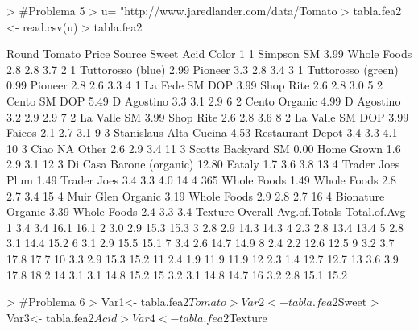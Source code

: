 \documentclass{article}
\begin{document}
\begin{Schunk}
\begin{Sinput}
> #Problema 5
> u= "http://www.jaredlander.com/data/Tomato%20First.csv"
> tabla.fea2 <- read.csv(u)
> tabla.fea2
\end{Sinput}
\begin{Soutput}
   Round                   Tomato Price           Source Sweet Acid Color
1      1               Simpson SM  3.99      Whole Foods   2.8  2.8   3.7
2      1        Tuttorosso (blue)  2.99          Pioneer   3.3  2.8   3.4
3      1       Tuttorosso (green)  0.99          Pioneer   2.8  2.6   3.3
4      1           La Fede SM DOP  3.99        Shop Rite   2.6  2.8   3.0
5      2             Cento SM DOP  5.49       D Agostino   3.3  3.1   2.9
6      2            Cento Organic  4.99       D Agostino   3.2  2.9   2.9
7      2              La Valle SM  3.99        Shop Rite   2.6  2.8   3.6
8      2          La Valle SM DOP  3.99           Faicos   2.1  2.7   3.1
9      3   Stanislaus Alta Cucina  4.53 Restaurant Depot   3.4  3.3   4.1
10     3                     Ciao    NA            Other   2.6  2.9   3.4
11     3       Scotts Backyard SM  0.00       Home Grown   1.6  2.9   3.1
12     3 Di Casa Barone (organic) 12.80           Eataly   1.7  3.6   3.8
13     4         Trader Joes Plum  1.49      Trader Joes   3.4  3.3   4.0
14     4          365 Whole Foods  1.49      Whole Foods   2.8  2.7   3.4
15     4        Muir Glen Organic  3.19      Whole Foods   2.9  2.8   2.7
16     4        Bionature Organic  3.39      Whole Foods   2.4  3.3   3.4
   Texture Overall Avg.of.Totals Total.of.Avg
1      3.4     3.4          16.1         16.1
2      3.0     2.9          15.3         15.3
3      2.8     2.9          14.3         14.3
4      2.3     2.8          13.4         13.4
5      2.8     3.1          14.4         15.2
6      3.1     2.9          15.5         15.1
7      3.4     2.6          14.7         14.9
8      2.4     2.2          12.6         12.5
9      3.2     3.7          17.8         17.7
10     3.3     2.9          15.3         15.2
11     2.4     1.9          11.9         11.9
12     2.3     1.4          12.7         12.7
13     3.6     3.9          17.8         18.2
14     3.1     3.1          14.8         15.2
15     3.2     3.1          14.8         14.7
16     3.2     2.8          15.1         15.2
\end{Soutput}
\end{Schunk}

\begin{Schunk}
\begin{Sinput}
> #Problema 6
> Var1<- tabla.fea2$Tomato
> Var2<- tabla.fea2$Sweet
> Var3<- tabla.fea2$Acid
> Var4<- tabla.fea2$Texture
\end{Sinput}
\end{Schunk}
\end{document}
